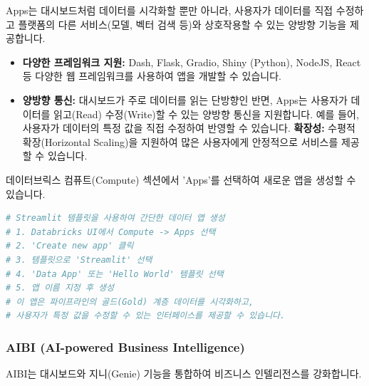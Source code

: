 \documentclass[11pt,a4paper]{article}
\theoremstyle{definition}
\begin{document}
\begin{tcolorbox}[summary={Apps의 특징 및 대시보드와의 차이점}]
Apps는 대시보드처럼 데이터를 시각화할 뿐만 아니라, 사용자가 데이터를 직접 수정하고 플랫폼의 다른 서비스(모델, 벡터 검색 등)와 상호작용할 수 있는 양방향 기능을 제공합니다.
\end{tcolorbox}

\begin{itemize}
    \item \textbf{다양한 프레임워크 지원:} Dash, Flask, Gradio, Shiny (Python), NodeJS, React 등 다양한 웹 프레임워크를 사용하여 앱을 개발할 수 있습니다.
    \item \textbf{양방향 통신:} 대시보드가 주로 데이터를 읽는 단방향인 반면, Apps는 사용자가 데이터를 읽고(Read) 수정(Write)할 수 있는 양방향 통신을 지원합니다. 예를 들어, 사용자가 데이터의 특정 값을 직접 수정하여 반영할 수 있습니다.
    \textbf{확장성:} 수평적 확장(Horizontal Scaling)을 지원하여 많은 사용자에게 안정적으로 서비스를 제공할 수 있습니다.
\end{itemize}

\begin{tcolorbox}[example={Apps 생성 예시}]
데이터브릭스 컴퓨트(Compute) 섹션에서 'Apps'를 선택하여 새로운 앱을 생성할 수 있습니다.
\begin{lstlisting}[language=Python, caption=Streamlit 기반 Hello World 앱 예시]
# Streamlit 템플릿을 사용하여 간단한 데이터 앱 생성
# 1. Databricks UI에서 Compute -> Apps 선택
# 2. 'Create new app' 클릭
# 3. 템플릿으로 'Streamlit' 선택
# 4. 'Data App' 또는 'Hello World' 템플릿 선택
# 5. 앱 이름 지정 후 생성
# 이 앱은 파이프라인의 골드(Gold) 계층 데이터를 시각화하고,
# 사용자가 특정 값을 수정할 수 있는 인터페이스를 제공할 수 있습니다.
\end{lstlisting}
\end{tcolorbox}

\subsubsection{AIBI (AI-powered Business Intelligence)}
AIBI는 대시보드와 지니(Genie) 기능을 통합하여 비즈니스 인텔리전스를 강화합니다.
\end{document}
